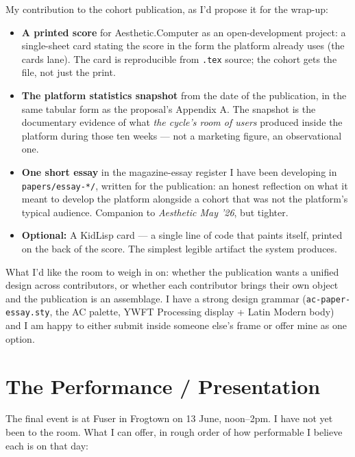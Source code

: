 \documentclass[11pt,letterpaper]{article}
\newcommand{\ac}{Aesthetic\textcolor{acpink}{.}Computer}
\begin{document}
My contribution to the cohort publication, as I'd propose it for the wrap-up:

\begin{itemize}
  \item \textbf{A printed score} for \ac{} as an open-development project: a single-sheet card stating the score in the form the platform already uses (the cards lane). The card is reproducible from \texttt{.tex} source; the cohort gets the file, not just the print.
  \item \textbf{The platform statistics snapshot} from the date of the publication, in the same tabular form as the proposal's Appendix A. The snapshot is the documentary evidence of what \emph{the cycle's room of users} produced inside the platform during those ten weeks --- not a marketing figure, an observational one.
  \item \textbf{One short essay} in the magazine-essay register I have been developing in \texttt{papers/essay-*/}, written for the publication: an honest reflection on what it meant to develop the platform alongside a cohort that was not the platform's typical audience. Companion to \textit{Aesthetic May '26}, but tighter.
  \item \textbf{Optional:} A KidLisp card --- a single line of code that paints itself, printed on the back of the score. The simplest legible artifact the system produces.
\end{itemize}

What I'd like the room to weigh in on: whether the publication wants a unified design across contributors, or whether each contributor brings their own object and the publication is an assemblage. I have a strong design grammar (\texttt{ac-paper-essay.sty}, the AC palette, YWFT Processing display + Latin Modern body) and I am happy to either submit inside someone else's frame or offer mine as one option.

\section{The Performance / Presentation}

The final event is at Fuser in Frogtown on 13 June, noon--2pm. I have not yet been to the room. What I can offer, in rough order of how performable I believe each is on that day:
\end{document}
